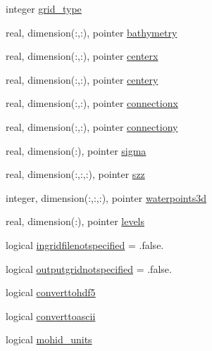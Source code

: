 \begin{DoxyCompactItemize}
\item 
integer \mbox{\hyperlink{structmodulewoaformat_1_1t__woaformat_ad25ee1d2aa838f18934c407ec8d5d524}{grid\+\_\+type}}
\item 
real, dimension(\+:,\+:), pointer \mbox{\hyperlink{structmodulewoaformat_1_1t__woaformat_aaa4b7a5abec6d45a7c3fe3190777ade3}{bathymetry}}
\item 
real, dimension(\+:,\+:), pointer \mbox{\hyperlink{structmodulewoaformat_1_1t__woaformat_a57ed34fd53bb45293c6c429953b988ad}{centerx}}
\item 
real, dimension(\+:,\+:), pointer \mbox{\hyperlink{structmodulewoaformat_1_1t__woaformat_a344ce68ed738a3ad22e763008700211c}{centery}}
\item 
real, dimension(\+:,\+:), pointer \mbox{\hyperlink{structmodulewoaformat_1_1t__woaformat_aadbf7a3932f055c110e6814970195e38}{connectionx}}
\item 
real, dimension(\+:,\+:), pointer \mbox{\hyperlink{structmodulewoaformat_1_1t__woaformat_ae0ec926914b018e8066f4d3d3d73cea5}{connectiony}}
\item 
real, dimension(\+:), pointer \mbox{\hyperlink{structmodulewoaformat_1_1t__woaformat_a7844327d14dc178dee8d85682a829753}{sigma}}
\item 
real, dimension(\+:,\+:,\+:), pointer \mbox{\hyperlink{structmodulewoaformat_1_1t__woaformat_ae227c03efdf8625960a55922df9e9595}{szz}}
\item 
integer, dimension(\+:,\+:,\+:), pointer \mbox{\hyperlink{structmodulewoaformat_1_1t__woaformat_af00d187e34211eff8937ad8b2f0c9f62}{waterpoints3d}}
\item 
real, dimension(\+:), pointer \mbox{\hyperlink{structmodulewoaformat_1_1t__woaformat_a258925605828c6e1cf21064e23f09d8f}{levels}}
\item 
logical \mbox{\hyperlink{structmodulewoaformat_1_1t__woaformat_acf659d116eb797e3bf3b1a625ae13967}{ingridfilenotspecified}} = .false.
\item 
logical \mbox{\hyperlink{structmodulewoaformat_1_1t__woaformat_a0ea2a7a668209ae4f0a5e6cdb4c537a3}{outputgridnotspecified}} = .false.
\item 
logical \mbox{\hyperlink{structmodulewoaformat_1_1t__woaformat_a5a7cc06fa1ebab263c7bd7c580dd00d5}{converttohdf5}}
\item 
logical \mbox{\hyperlink{structmodulewoaformat_1_1t__woaformat_a3ed7a4d99963d8fc1b2c3af9fbf01ef5}{converttoascii}}
\item 
logical \mbox{\hyperlink{structmodulewoaformat_1_1t__woaformat_aa07035278d5f45520783305a373b7980}{mohid\+\_\+units}}

\end{DoxyCompactItemize}
